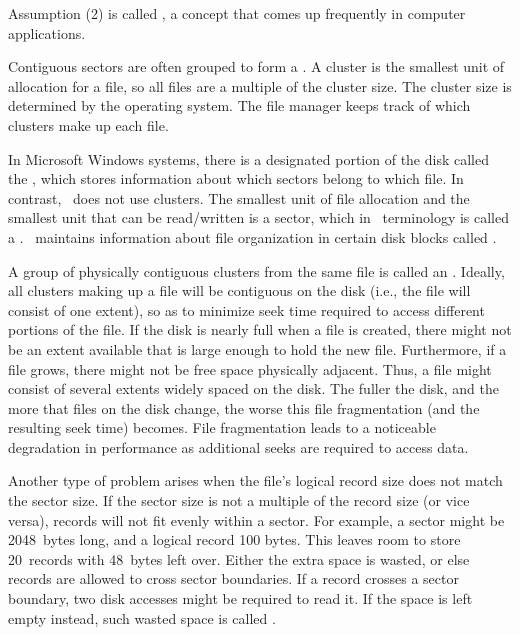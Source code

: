 \noindent Assumption (2) is called
,
a concept that comes up frequently in computer applications.

Contiguous sectors are often grouped to form a
.
A cluster is the smallest unit of allocation for a file,
so all files are a multiple of the cluster size.
The cluster size is determined by the operating
system.
The file manager keeps track of which clusters
make up each file.

In Microsoft Windows systems, there is a
designated portion of the disk called the , which stores information about which sectors belong to which
file.
In contrast, \UNIX\ does not use clusters.
The smallest unit of file allocation and the smallest unit that can be
read/written is a sector, which in \UNIX\ terminology is called
a .
\UNIX\ maintains information about file organization in certain disk
blocks called .

A group of physically contiguous clusters from the same file is called
an .
Ideally, all clusters making up a file will be contiguous on the disk
(i.e., the file will consist of one extent),
so as to minimize seek time required to access different portions of
the file.
If the disk is nearly full when a file is created, there might not be
an extent available that is large enough to hold the new file.
Furthermore, if a file grows, there might not be free space physically
adjacent.
Thus, a file might consist of several extents widely spaced on the
disk.
The fuller the disk, and the more that files on the disk change, the
worse this file fragmentation (and the resulting seek time) becomes.
File fragmentation leads to a noticeable degradation in performance as
additional seeks are required to access data.

Another type of problem arises when the file's logical record size
does not match the sector size.
If the sector size is not a multiple of the record size
(or vice versa), records will not fit evenly within a sector.
For example, a sector might be 2048~bytes long, and a logical record
100 bytes.
This leaves room to store 20~records with 48~bytes left over.
Either the extra space is wasted, or else records
are allowed to cross sector boundaries.
If a record crosses a sector boundary, two disk accesses might be
required to read it.
If the space is left empty instead, such wasted space is called
.

